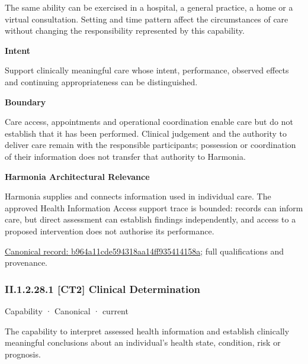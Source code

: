 The same ability can be exercised in a hospital, a general practice, a home or a virtual consultation. Setting and time pattern affect the circumstances of care without changing the responsibility represented by this capability.



\textbf{Intent}



Support clinically meaningful care whose intent, performance, observed effects and continuing appropriateness can be distinguished.



\textbf{Boundary}



Care access, appointments and operational coordination enable care but do not establish that it has been performed. Clinical judgement and the authority to deliver care remain with the responsible participants; possession or coordination of their information does not transfer that authority to Harmonia.



\textbf{Harmonia Architectural Relevance}



Harmonia supplies and connects information used in individual care. The approved Health Information Access support trace is bounded: records can inform care, but direct assessment can establish findings independently, and access to a proposed intervention does not authorise its performance.


{\footnotesize \href{../../../../continuum/strategy/capability/b964a11cde594318aa14ff935414158a.md}{Canonical record: b964a11cde594318aa14ff935414158a}; full qualifications and provenance.}\par
\subsubsection*{II.1.2.28.1 [CT2] Clinical Determination}
\label{navigation:II.1.2.28.1}

\label{element:39219464b6304b59bd7c3de4e237066e}
{\small Capability · Canonical · current}\par

The capability to interpret assessed health information and establish clinically meaningful conclusions about an individual's health state, condition, risk or prognosis.



